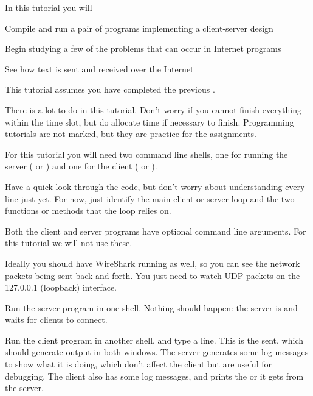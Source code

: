 










In this tutorial you will

\DOT Compile and run a pair of programs implementing a client-server design

\DOT Begin studying a few of the problems that can occur in Internet programs

\DOT See how text is sent and received over the Internet

\begin{IMPORTANT}
This tutorial assumes you have completed the previous .

There is a lot to do in this tutorial. Don't worry if you cannot finish everything
within the time slot, but do allocate time if necessary to finish. Programming
tutorials are not marked, but they are practice for the assignments.
\end{IMPORTANT}



For this tutorial you will need two command line shells, one for running
the server ( or ) and one for the client
( or ).

Have a quick look through the code, but don't worry about understanding every
line just yet. For now, just identify the main client or server loop and the two
functions or methods that the loop relies on.

Both the client and server programs have optional command line arguments. For
this tutorial we will not use these.

Ideally you should have WireShark running as well, so you can see the network
packets being sent back and forth. You just need to watch UDP packets
on the 127.0.0.1 (loopback) interface.

Run the server program in one shell. Nothing should happen: the server is 
and waits for clients to connect.

Run the client program in another shell, and type a line. This is the 
sent, which should generate output in both windows.
The server generates some log messages to show what it is doing, which don't affect
the client but are useful for debugging. The client also has some log messages, and
prints the  or  it gets from the server.

